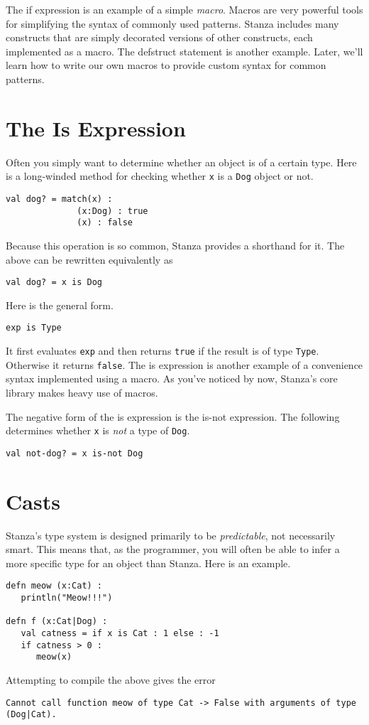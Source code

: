 \documentclass[10pt,oneside]{book}
\begin{document}
The if expression is an example of a simple {\em macro}. Macros are very powerful tools for simplifying the syntax of commonly used patterns. Stanza includes many constructs that are simply decorated versions of other constructs, each implemented as a macro. The defstruct statement is another example. Later, we'll learn how to write our own macros to provide custom syntax for common patterns.

\section{The Is Expression}
Often you simply want to determine whether an object is of a certain type. Here is a long-winded method for checking whether \texttt{\frenchspacing x} is a \texttt{\frenchspacing Dog} object or not.
\begin{lstlisting}
val dog? = match(x) :
              (x:Dog) : true
              (x) : false
\end{lstlisting}

Because this operation is so common, Stanza provides a shorthand for it. The above can be rewritten equivalently as
\begin{lstlisting}
val dog? = x is Dog
\end{lstlisting}

Here is the general form.
\begin{lstlisting}
exp is Type
\end{lstlisting}
It first evaluates \texttt{\frenchspacing exp} and then returns \texttt{\frenchspacing true} if the result is of type \texttt{\frenchspacing Type}. Otherwise it returns \texttt{\frenchspacing false}. The is expression is another example of a convenience syntax implemented using a macro. As you've noticed by now, Stanza's core library makes heavy use of macros.

The negative form of the is expression is the is-not expression. The following determines whether \texttt{\frenchspacing x} is {\em not} a type of \texttt{\frenchspacing Dog}.
\begin{lstlisting}
val not-dog? = x is-not Dog
\end{lstlisting}

\section{Casts}
Stanza's type system is designed primarily to be {\em predictable}, not necessarily smart. This means that, as the programmer, you will often be able to infer a more specific type for an object than Stanza. Here is an example.
\begin{lstlisting}
defn meow (x:Cat) :
   println("Meow!!!")
   
defn f (x:Cat|Dog) :
   val catness = if x is Cat : 1 else : -1
   if catness > 0 :
      meow(x)
\end{lstlisting}
Attempting to compile the above gives the error
\begin{lstlisting}
Cannot call function meow of type Cat -> False with arguments of type (Dog|Cat).
\end{lstlisting}
\end{document}
